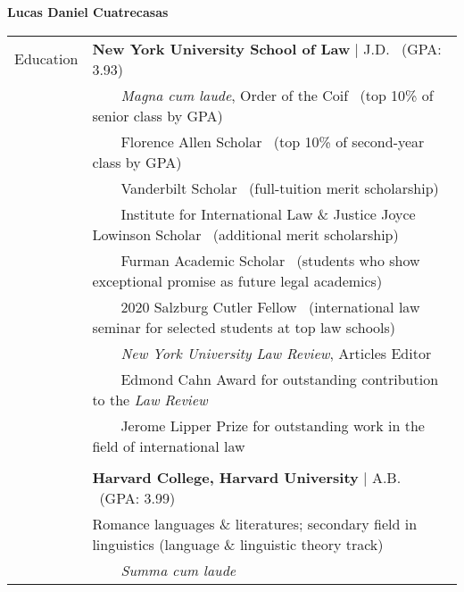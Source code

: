 \documentclass[a4paper,11pt,oneside]{article}
\newcommand{\years}[1]{\marginnote{\scriptsize #1}}
\newcommand{\tabitem}{~~\llap{\footnotesize{\textbullet}}~~}
\newcommand{\raum}{\vspace{1.5ex}}
\begin{document}
\thispagestyle{empty}

\noindent \LARGE{\textbf{Lucas Daniel Cuatrecasas}} \\
\noindent\makebox[\textwidth][l]{\rule{1.15\textwidth}{0.075ex}}
\noindent \footnotesize
{}

\vspace{5ex}

\noindent \begin{tabular}{@{} l l}
\years{2021} \large{Education} & \small{\textbf{New York University School of Law} | J.D.} \ \footnotesize (GPA: 3.93) \raum \\
     & \tabitem \textit{Magna cum laude}, Order of the Coif \ (top 10\% of senior class by GPA) \\
     & \tabitem Florence Allen Scholar \ (top 10\% of second-year class by GPA) \\
     & \tabitem Vanderbilt Scholar \ (full-tuition merit scholarship) \\
     & \tabitem Institute for International Law \& Justice Joyce Lowinson Scholar \ (additional merit scholarship) \\
     & \tabitem Furman Academic Scholar \ (students who show exceptional promise as future legal academics) \\
     & \tabitem 2020 Salzburg Cutler Fellow \ (international law seminar for selected students at top law schools) \\
     & \tabitem \textit{New York University Law Review}, Articles Editor \\
     & \tabitem Edmond Cahn Award for outstanding contribution to the \textit{Law Review} \\
     & \tabitem Jerome Lipper Prize for outstanding work in the field of international law \\
     & \\
\years{2018} & \small{\textbf{Harvard College, Harvard University} | A.B.} \ \footnotesize (GPA: 3.99)\\
     & Romance languages \& literatures; secondary field in linguistics (language \& linguistic theory track) \raum \\
     & \tabitem \textit{Summa cum laude} \\

\end{tabular}
\end{document}
